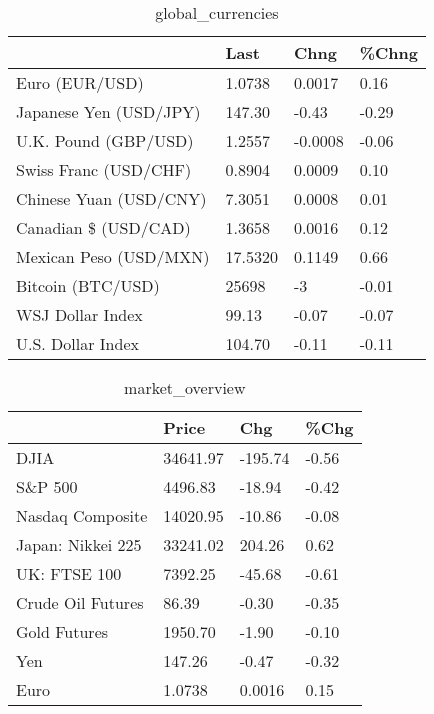 \documentclass{article}%
\begin{document}
%


\begin{table}[htbp]%
\caption{global\_currencies}%
\centering%
\begin{adjustbox}{width=1\textwidth}%
\begin{tabular}{llll}
\toprule
                       &    Last &    Chng & \%Chng \\
\midrule
        Euro (EUR/USD) &  1.0738 &  0.0017 &  0.16 \\
Japanese Yen (USD/JPY) &  147.30 &   -0.43 & -0.29 \\
  U.K. Pound (GBP/USD) &  1.2557 & -0.0008 & -0.06 \\
 Swiss Franc (USD/CHF) &  0.8904 &  0.0009 &  0.10 \\
Chinese Yuan (USD/CNY) &  7.3051 &  0.0008 &  0.01 \\
  Canadian \$ (USD/CAD) &  1.3658 &  0.0016 &  0.12 \\
Mexican Peso (USD/MXN) & 17.5320 &  0.1149 &  0.66 \\
     Bitcoin (BTC/USD) &   25698 &      -3 & -0.01 \\
      WSJ Dollar Index &   99.13 &   -0.07 & -0.07 \\
     U.S. Dollar Index &  104.70 &   -0.11 & -0.11 \\
\bottomrule
\end{tabular}
%
\end{adjustbox}%
\end{table}

%


\begin{table}[htbp]%
\caption{market\_overview}%
\centering%
\begin{adjustbox}{width=1\textwidth}%
\begin{tabular}{llll}
\toprule
                  &    Price &     Chg &  \%Chg \\
\midrule
             DJIA & 34641.97 & -195.74 & -0.56 \\
          S\&P 500 &  4496.83 &  -18.94 & -0.42 \\
 Nasdaq Composite & 14020.95 &  -10.86 & -0.08 \\
Japan: Nikkei 225 & 33241.02 &  204.26 &  0.62 \\
     UK: FTSE 100 &  7392.25 &  -45.68 & -0.61 \\
Crude Oil Futures &    86.39 &   -0.30 & -0.35 \\
     Gold Futures &  1950.70 &   -1.90 & -0.10 \\
              Yen &   147.26 &   -0.47 & -0.32 \\
             Euro &   1.0738 &  0.0016 &  0.15 \\
\bottomrule
\end{tabular}
%
\end{adjustbox}%
\end{table}

%
\end{document}

